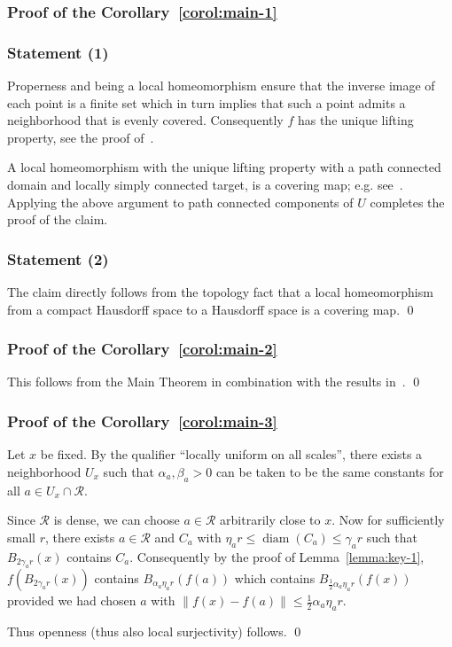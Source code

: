 \documentclass[a4, 12pt,leqno]{amsart}
\theoremstyle{plain}
\theoremstyle{definition}
\theoremstyle{remark}
\numberwithin{equation}{section}
\DeclareMathOperator{\diam}{diam}		%
\begin{document}
\subsubsection{\small \textbf{\textsf{Proof of the Corollary~\ref{corol:main-1}}}}
\subsubsection*{\small Statement (1)}
Properness and being a local homeomorphism ensure that the inverse image of each point is a finite set which in turn implies that such a point admits a neighborhood that is evenly covered. Consequently $f$ has the unique lifting property, see the proof of~\cite[Proposition 1.30]{Hatch}. 
\par A local homeomorphism with the unique lifting property with a path connected domain and locally simply connected target, is a covering map; e.g. see~\cite[Section 5.6, Proposition 6]{Doc}. Applying the above argument to path connected components of $U$ completes the proof of the claim.
\subsubsection*{\small Statement (2)}
The claim directly follows from the topology fact that a local homeomorphism from a compact Hausdorff space to a Hausdorff space is a covering map.
\qed
\subsubsection{\small\textbf{\textsf{Proof of the Corollary~\ref{corol:main-2}}}}
This follows from the Main Theorem in combination with the results in~\cite{Play}.
\qed
\subsubsection{\small\textbf{\textsf{Proof of the Corollary~\ref{corol:main-3}}}}
\par Let $x$ be fixed. By the qualifier ``locally uniform on all scales'', there exists a neighborhood $U_x$ such that $\alpha_a, \beta_a >0$ can be taken to be the same constants for all $a \in U_x \cap \mathcal{R}$.  
\par Since $\mathcal{R}$ is dense, we can choose $a \in \mathcal{R}$ arbitrarily close to $x$. Now for sufficiently small $r$, there exists $a\in \mathcal{R}$ and $C_a$ with $ \eta_a r \le \diam(C_a)\le \gamma_ar$ such that $B_{2\gamma_ar}(x)$ contains $C_a$. Consequently by the proof of Lemma~\ref{lemma:key-1}, $f(B_{2\gamma_ar}(x))$ contains $B_{\alpha_a\eta_ar}(f(a))$ which contains $B_{\frac{1}{2}\alpha_a\eta_ar}(f(x))$ provided we had chosen $a$ with $\|f(x)-f(a)\| \le \frac{1}{2}\alpha_a\eta_ar$. 
\par Thus openness (thus also local surjectivity) follows. 
  \qed
\end{document}
